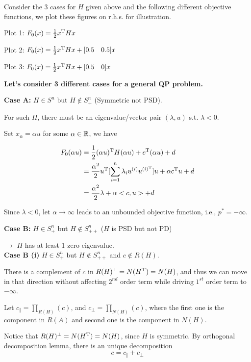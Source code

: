 Consider the 3 cases for $H$ given above and the following different objective functions, we plot these figures on r.h.s. for illustration.

Plot 1: $F_0(x) =\frac{1}{2}x^{{\rm T}}Hx$

Plot 2: $F_0(x) =\frac{1}{2}x^{{\rm T}}Hx + [0.5\quad 0.5]x$

Plot 3: $F_0(x) =\frac{1}{2}x^{{\rm T}}Hx + [0.5\quad 0]x$


\vspace{0.5cm}
\textbf{Let's consider 3 different cases for a general QP problem.}

\textbf{Case A: } $H\in S^n$ but $H\notin S^n_+$ (Symmetric not PSD).

For such $H$, there must be an eigenvalue/vector pair $(\lambda, u)$ s.t. $\lambda < 0$.

Set $x_{\alpha} = \alpha u$ for some $\alpha \in \mathbb{R}$, we have

\begin{align*}
F_0(\alpha u) &= \frac{1}{2}(\alpha u)^{{\rm T}}H(\alpha u) + c^{{\rm T}}(\alpha u) + d\\
&= \frac{{\alpha}^2}{2} u^{{\rm T}}[\sum^n_{i=1}\lambda_i u^{(i)} u^{(i)^{{\rm T}}}]u + \alpha c^{{\rm T}}u + d\\
&= \frac{{\alpha}^2}{2}\lambda + \alpha <c,u> + d
\end{align*}

Since $\lambda<0$, let $\alpha \to \infty$ leads to an unbounded objective function, i.e., $p^* = -\infty$.



\vspace{0.3cm}
\textbf{Case B: } $H\in S_+^n$ but $H\notin S^n_{++}$ ($H$ is PSD but not PD)

$\rightarrow$ $H$ has at least 1 zero eigenvalue.\\

\vspace{0.3cm}
\textbf{Case B (i)} $H\in S_+^n$ but $H\notin S^n_{++}$ and $c \notin R(H)$.

There is a complement of $c$ in $R(H)^{\perp} = N(H^{{\rm T}}) = N(H)$, and thus we can move in that direction without affecting $2^{nd}$ order term while driving $1^{st} $ order term to $-\infty$.

Let $c_{\Vert} = \prod_{R(H)}(c)$,  and $c_{\perp} = \prod_{N(H)}(c)$, where the first one is the component in $R(A)$ and second one is the component in $N(H)$.

Notice that $R(H)^{\perp}= N(H^{{\rm T}}) = N(H)$, since $H$ is symmetric. By orthogonal decomposition lemma, there is an unique decomposition
$$c = c_{\Vert} + c_{\perp}$$

